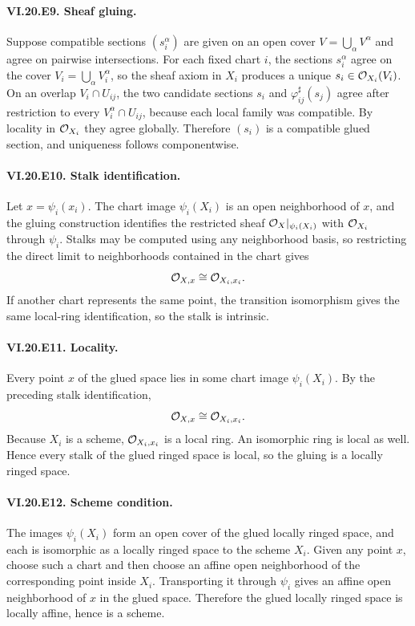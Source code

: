 \paragraph{VI.20.E9. Sheaf gluing.}
\begin{solution}
Suppose compatible sections $(s_i^\alpha)$ are given on an open cover $V=\bigcup_\alpha V^\alpha$ and agree on pairwise intersections.  For each fixed chart $i$, the sections $s_i^\alpha$ agree on the cover $V_i=\bigcup_\alpha V_i^\alpha$, so the sheaf axiom in $X_i$ produces a unique $s_i\in\mathcal O_{X_i}(V_i)$.  On an overlap $V_i\cap U_{ij}$, the two candidate sections
$s_i$ and $\varphi_{ij}^{\sharp}(s_j)$ agree after restriction to every $V_i^\alpha\cap U_{ij}$, because each local family was compatible.  By locality in $\mathcal O_{X_i}$ they agree globally.  Therefore $(s_i)$ is a compatible glued section, and uniqueness follows componentwise.
\end{solution}

\paragraph{VI.20.E10. Stalk identification.}
\begin{solution}
Let $x=\psi_i(x_i)$.  The chart image $\psi_i(X_i)$ is an open neighborhood of $x$, and the gluing construction identifies the restricted sheaf $\mathcal O_X|_{\psi_i(X_i)}$ with $\mathcal O_{X_i}$ through $\psi_i$.  Stalks may be computed using any neighborhood basis, so restricting the direct limit to neighborhoods contained in the chart gives
\[
\mathcal O_{X,x}\cong \mathcal O_{X_i,x_i}.
\]
If another chart represents the same point, the transition isomorphism gives the same local-ring identification, so the stalk is intrinsic.
\end{solution}

\paragraph{VI.20.E11. Locality.}
\begin{solution}
Every point $x$ of the glued space lies in some chart image $\psi_i(X_i)$.  By the preceding stalk identification,
\[
\mathcal O_{X,x}\cong\mathcal O_{X_i,x_i}.
\]
Because $X_i$ is a scheme, $\mathcal O_{X_i,x_i}$ is a local ring.  An isomorphic ring is local as well.  Hence every stalk of the glued ringed space is local, so the gluing is a locally ringed space.
\end{solution}

\paragraph{VI.20.E12. Scheme condition.}
\begin{solution}
The images $\psi_i(X_i)$ form an open cover of the glued locally ringed space, and each is isomorphic as a locally ringed space to the scheme $X_i$.  Given any point $x$, choose such a chart and then choose an affine open neighborhood of the corresponding point inside $X_i$.  Transporting it through $\psi_i$ gives an affine open neighborhood of $x$ in the glued space.  Therefore the glued locally ringed space is locally affine, hence is a scheme.
\end{solution}

